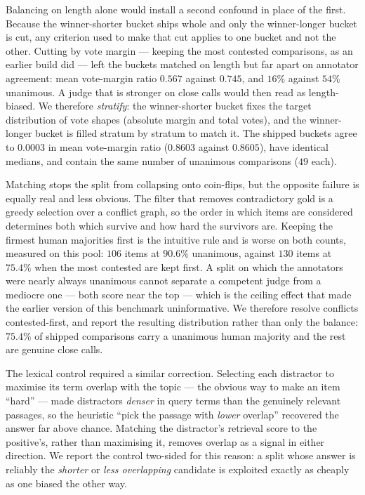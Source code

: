 \documentclass[11pt]{article}          %
\begin{document}
Balancing on length alone would install a second confound in place of the first.
Because the winner-shorter bucket ships whole and only the winner-longer bucket
is cut, any criterion used to make that cut applies to one bucket and not the
other. Cutting by vote margin --- keeping the most contested comparisons, as an
earlier build did --- left the buckets matched on length but far apart on
annotator agreement: mean vote-margin ratio $0.567$ against $0.745$, and $16\%$
against $54\%$ unanimous. A judge that is stronger on close calls would then
read as length-biased. We therefore \emph{stratify}: the winner-shorter bucket
fixes the target distribution of vote shapes (absolute margin and total votes),
and the winner-longer bucket is filled stratum by stratum to match it. The
shipped buckets agree to $0.0003$ in mean vote-margin ratio ($0.8603$ against
$0.8605$), have identical medians, and contain the same number of unanimous
comparisons ($49$ each).

Matching stops the split from collapsing onto coin-flips, but the opposite
failure is equally real and less obvious. The filter that removes contradictory
gold is a greedy selection over a conflict graph, so the order in which items are
considered determines both which survive and how hard the survivors are. Keeping
the firmest human majorities first is the intuitive rule and is worse on both
counts, measured on this pool: $106$ items at $90.6\%$ unanimous, against $130$
items at $75.4\%$ when the most contested are kept first. A split on which the
annotators were nearly always unanimous cannot separate a competent judge from a
mediocre one --- both score near the top --- which is the ceiling effect that
made the earlier version of this benchmark uninformative. We therefore resolve
conflicts contested-first, and report the resulting distribution rather than only
the balance: $75.4\%$ of shipped comparisons carry a unanimous human majority and
the rest are genuine close calls.

The lexical control required a similar correction. Selecting each distractor to
maximise its term overlap with the topic --- the obvious way to make an item
``hard'' --- made distractors \emph{denser} in query terms than the genuinely
relevant passages, so the heuristic ``pick the passage with \emph{lower} overlap''
recovered the answer far above chance. Matching the distractor's retrieval score
to the positive's, rather than maximising it, removes overlap as a signal in
either direction. We report the control two-sided for this reason: a split whose
answer is reliably the \emph{shorter} or \emph{less overlapping} candidate is
exploited exactly as cheaply as one biased the other way.
\end{document}
